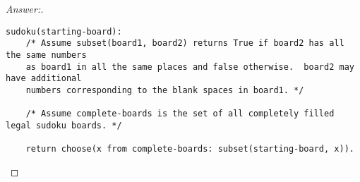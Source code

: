 \documentclass[10pt]{article}
\begin{document}
\begin{enumerate}
\begin{proof}[Answer:]
\begin{verbatim}
sudoku(starting-board):
    /* Assume subset(board1, board2) returns True if board2 has all the same numbers
    as board1 in all the same places and false otherwise.  board2 may have additional
    numbers corresponding to the blank spaces in board1. */
    
    /* Assume complete-boards is the set of all completely filled legal sudoku boards. */
    
    return choose(x from complete-boards: subset(starting-board, x)).
\end{verbatim}
\end{proof}
\end{enumerate}
\end{document}
